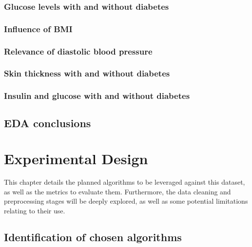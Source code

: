 \documentclass[12pt]{report}
\begin{document}
\subsection{Glucose levels with and without diabetes}


\subsection{Influence of BMI}


\subsection{Relevance of diastolic blood pressure}


\subsection{Skin thickness with and without diabetes}


\subsection{Insulin and glucose with and without diabetes}





\section{EDA conclusions}


\chapter{Experimental Design} %
This chapter details the planned algorithms to be leveraged against this dataset,
as well as the metrics to evaluate them. Furthermore, the data cleaning and preprocessing 
stages will be deeply explored, as well as some potential limitations relating to their use.

\section{Identification of chosen algorithms}
\end{document}
